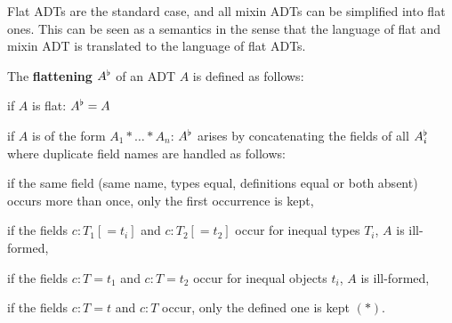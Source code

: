 Flat ADTs are the standard case, and all mixin ADTs can be simplified into flat ones.
This can be seen as a semantics in the sense that the language of flat and mixin ADT is translated to the language of flat ADTs.
\begin{definition}\label{def:mixinflat}
The \textbf{flattening} $A^\flat$ of an ADT $A$ is defined as follows:
\begin{compactitem}
 \item if $A$ is flat: $A^\flat=A$
 \item if $A$ is of the form $A_1*\ldots*A_n$:
 $A^\flat$ arises by concatenating the fields of all $A_i^\flat$ where duplicate field names are handled as follows:
  \begin{compactitem}
   \item if the same field (same name, types equal, definitions equal or both absent) occurs more than once, only the first occurrence is kept,
   \item if the fields $c:T_1[=t_i]$ and $c:T_2[=t_2]$ occur for inequal types $T_i$, $A$ is ill-formed,
   \item if the fields $c:T=t_1$ and $c:T=t_2$ occur for inequal objects $t_i$, $A$ is ill-formed,
   \item if the fields $c:T=t$ and $c:T$ occur, only the defined one is kept $(\ast)$.
  \end{compactitem}
\end{compactitem}
\end{definition}

